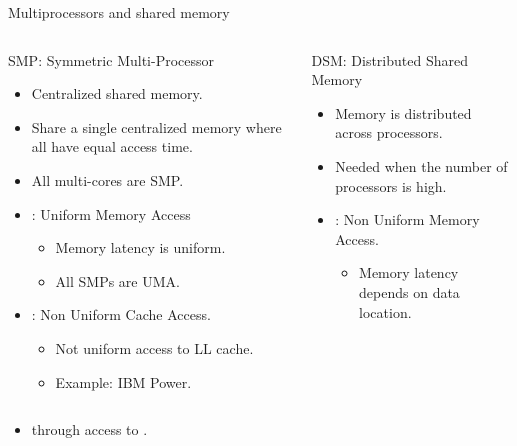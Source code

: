 \begin{frame}[t,shrink=10]{Multiprocessors and shared memory}

\vspace{-1em}
\begin{columns}[T]


\begin{block}{SMP: Symmetric Multi-Processor}
\begin{itemize}
  \item Centralized shared memory.
  \item Share a single centralized memory where all have equal access time.
  \item All multi-cores are SMP.
  \item {}: Uniform Memory Access
    \begin{itemize}
      \item Memory latency is uniform.
      \item All SMPs are UMA.
    \end{itemize}
  \item {}: Non Uniform Cache Access.
    \begin{itemize}
      \item Not uniform access to LL cache.
      \item Example: IBM Power.
    \end{itemize} 
\end{itemize}
\end{block}

\pause
{}

\begin{block}{DSM: Distributed Shared Memory}
\begin{itemize}
  \item Memory is distributed across processors.
  \item Needed when the number of processors is high.
  \item {}: Non Uniform Memory Access.
    \begin{itemize}
      \item Memory latency depends on data location.
    \end{itemize}
\end{itemize}
\end{block}

\end{columns}


\begin{itemize}
  \item {} through access to .
\end{itemize}
\end{frame}

